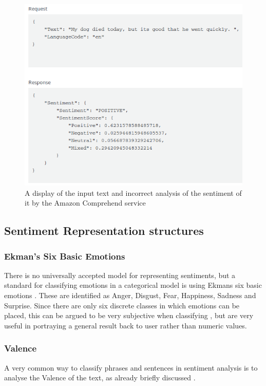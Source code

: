 \begin{figure}[ht]
\centering
\includegraphics[scale=0.5]{litImgs/comphrendResult.png}
\caption{A display of the input text and incorrect analysis of the sentiment of it by the Amazon Comprehend service}
\label{aws:sentiment}
\end{figure}

\subsection{Sentiment Representation structures}

\subsubsection{Ekman's Six Basic Emotions}

There is no universally accepted model for representing sentiments, but a standard for classifying emotions in a categorical model is using Ekmans six basic emotions \cite{Ekman}. These are identified as Anger, Disgust, Fear, Happiness, Sadness and Surprise. Since there are only six discrete classes in which emotions can be placed, this can be argued to be very subjective when classifying \cite{emoBank}, but are very useful in portraying a general result back to user rather than numeric values.

\subsubsection{Valence}
A very common way to classify phrases and sentences in sentiment analysis is to analyse the Valence of the text, as already briefly discussed \cite{frijda1986emotions}.

